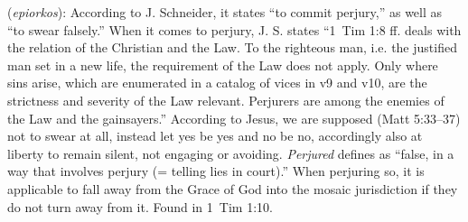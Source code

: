 \item[Perjured,]

(\textit{epiorkos}):
According to J. Schneider, it states ``to commit perjury,'' as well as ``to swear falsely.'' When it comes to perjury, J. S. states ``1~Tim 1:8 ff. deals with the relation of the Christian and the Law. To the righteous man, i.e. the justified man set in a new life, the requirement of the Law does not apply. Only where sins arise, which are enumerated in a catalog of vices in v9 and v10, are the strictness and severity of the Law relevant. Perjurers are among the enemies of the Law and the gainsayers.'' 
According to Jesus, we are supposed (Matt 5:33--37) not to swear at all, instead let yes be yes and no be no, accordingly also at liberty to remain silent, not engaging or avoiding. \emph{Perjured} defines as ``false, in a way that involves perjury (= telling lies in court).'' When perjuring so, it is applicable to fall away from the Grace of God into the mosaic jurisdiction if they do not turn away from it.
Found in 1~Tim 1:10.
